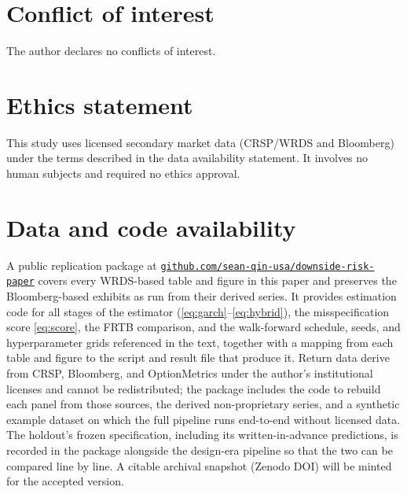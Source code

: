 \documentclass[11pt]{article}
\theoremstyle{remark}
\begin{document}
\section*{Conflict of interest}
The author declares no conflicts of interest.

\section*{Ethics statement}
This study uses licensed secondary market data (CRSP/WRDS and
Bloomberg) under the terms described in the data availability
statement. It involves no human subjects and required no ethics
approval.

\section*{Data and code availability}
A public replication package at
\href{https://github.com/sean-qin-usa/downside-risk-paper}{\texttt{github.com/sean-qin-usa/downside-risk-paper}}
covers every WRDS-based table and figure in this paper and preserves
the Bloomberg-based exhibits as run from their derived series. It
provides estimation code for all stages of the estimator
(\eqref{eq:garch}--\eqref{eq:hybrid}), the misspecification score
\eqref{eq:score}, the FRTB comparison, and the walk-forward schedule, seeds, and hyperparameter grids
referenced in the text, together with a mapping from each table and
figure to the script and result file that produce it. Return data
derive from CRSP, Bloomberg, and OptionMetrics under the author's
institutional licenses and cannot be redistributed; the package
includes the code to rebuild each panel from those sources, the derived
non-proprietary series, and a synthetic example dataset on which the
full pipeline runs end-to-end without licensed data. The holdout's
frozen specification, including its written-in-advance predictions, is
recorded in the package alongside the design-era pipeline so that the
two can be compared line by line. A citable archival snapshot (Zenodo
DOI) will be minted for the accepted version.





\end{document}
